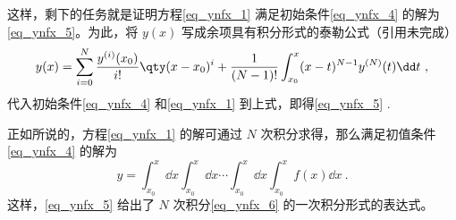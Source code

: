 这样，剩下的任务就是证明方程\autoref{eq_ynfx_1} 满足初始条件\autoref{eq_ynfx_4} 的解为\autoref{eq_ynfx_5}。为此，将 $y(x)$ 写成余项具有积分形式的泰勒公式（引用未完成）
\begin{equation}
y(x)=\sum_{i=0}^{N}\frac{y^{(i)}(x_0)}{i!}\qty(x-x_0)^{i}+\frac{1}{(N-1)!}\int_{x_0}^{x}(x-t)^{N-1}y^{(N)}(t)\dd t~,
\end{equation}
代入初始条件\autoref{eq_ynfx_4} 和\autoref{eq_ynfx_1} 到上式，即得\autoref{eq_ynfx_5} .

正如所说的，方程\autoref{eq_ynfx_1} 的解可通过 $N$ 次积分求得，那么满足初值条件\autoref{eq_ynfx_4} 的解为
\begin{equation}\label{eq_ynfx_6}
y=\int_{x_0}^x\dd x\int_{x_0}^x\dd x\cdots\int_{x_0}^{x}\dd x\int_{x_0}^{x}f(x)\dd x~.
\end{equation}
这样，\autoref{eq_ynfx_5} 给出了 $N$ 次积分\autoref{eq_ynfx_6} 的一次积分形式的表达式。
